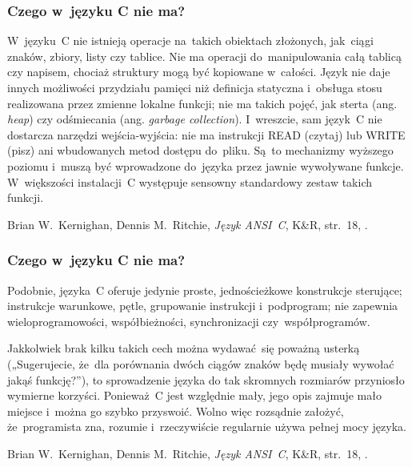 \documentclass[10pt,t]{beamer}
\begin{document}
\begin{frame}
  \frametitle{Czego w~języku C nie ma?}


  W~języku~C nie istnieją operacje na~takich obiektach złożonych, jak~ciągi
  znaków, zbiory, listy czy tablice. Nie ma operacji do~manipulowania całą
  tablicą czy napisem, chociaż struktury mogą być kopiowane w~całości.
  Język nie daje innych możliwości przydziału pamięci niż definicja
  statyczna i~obsługa stosu realizowana przez zmienne lokalne funkcji; nie
  ma takich pojęć, jak sterta (ang. \textit{heap}) czy odśmiecania
  (ang. \textit{garbage collection}). I~wreszcie, sam język~C nie dostarcza
  narzędzi wejścia-wyjścia: nie ma instrukcji READ (czytaj) lub WRITE (pisz)
  ani wbudowanych metod dostępu do~pliku. Są~to mechanizmy wyższego poziomu
  i~muszą być wprowadzone do~języka przez jawnie wywoływane funkcje.
  W~większości instalacji~C występuje sensowny standardowy zestaw takich
  funkcji.

  Brian W.~Kernighan, Dennis M.~Ritchie, \textit{Język ANSI~C}, K\&R,
  str.~18, \parencite{Kernighan-Ritchie-Jezyk-ANSI-C-Pub-2004}.

\end{frame}





\begin{frame}
  \frametitle{Czego w~języku C nie ma?}


  Podobnie, języka~C oferuje jedynie proste, jednościeżkowe konstrukcje
  sterujące; instrukcje warunkowe, pętle, grupowanie instrukcji
  i~podprogram; nie zapewnia wieloprogramowości, współbieżności,
  synchronizacji czy~współprogramów.

  Jakkolwiek brak kilku takich cech można wydawać~się poważną usterką
  („Sugerujecie, że~dla porównania dwóch ciągów znaków będę musiały wywołać
  jakąś funkcję?”), to sprowadzenie języka do tak skromnych rozmiarów
  przyniosło wymierne korzyści. Ponieważ~C jest względnie mały, jego opis
  zajmuje mało miejsce i~można go szybko przyswoić. Wolno więc rozsądnie
  założyć, że~programista zna, rozumie i~rzeczywiście regularnie używa
  pełnej mocy języka.

  Brian W.~Kernighan, Dennis M.~Ritchie, \textit{Język ANSI~C}, K\&R,
  str.~18, \parencite{Kernighan-Ritchie-Jezyk-ANSI-C-Pub-2004}.

\end{frame}
\end{document}
